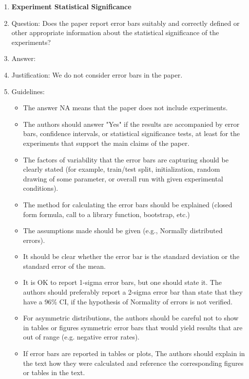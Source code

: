 \documentclass{article} %
\newcounter{ct}
\theoremstyle{definition}
\theoremstyle{remark}
\begin{document}
\begin{enumerate}
\item {\bf Experiment Statistical Significance}
    \item[] Question: Does the paper report error bars suitably and correctly defined or other appropriate information about the statistical significance of the experiments?
    \item[] Answer: \answerNA{} %
    \item[] Justification: We do not consider error bars in the paper.
    \item[] Guidelines:
    \begin{itemize}
        \item The answer NA means that the paper does not include experiments.
        \item The authors should answer "Yes" if the results are accompanied by error bars, confidence intervals, or statistical significance tests, at least for the experiments that support the main claims of the paper.
        \item The factors of variability that the error bars are capturing should be clearly stated (for example, train/test split, initialization, random drawing of some parameter, or overall run with given experimental conditions).
        \item The method for calculating the error bars should be explained (closed form formula, call to a library function, bootstrap, etc.)
        \item The assumptions made should be given (e.g., Normally distributed errors).
        \item It should be clear whether the error bar is the standard deviation or the standard error of the mean.
        \item It is OK to report 1-sigma error bars, but one should state it. The authors should preferably report a 2-sigma error bar than state that they have a 96\% CI, if the hypothesis of Normality of errors is not verified.
        \item For asymmetric distributions, the authors should be careful not to show in tables or figures symmetric error bars that would yield results that are out of range (e.g. negative error rates).
        \item If error bars are reported in tables or plots, The authors should explain in the text how they were calculated and reference the corresponding figures or tables in the text.
    \end{itemize}


\end{enumerate}
\end{document}
